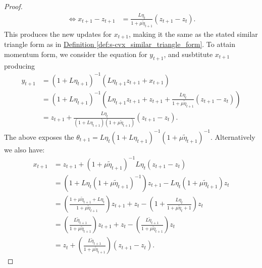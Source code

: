 \documentclass[12pt]{article}
\begin{document}
\begin{proof}
\begin{align*}
                \iff 
                x_{t + 1} - z_{t + 1} &= 
                \frac{L\eta_t}{1 + \mu \tilde \eta_{t + 1}} 
                (z_{t + 1} - z_t). 
            \end{align*}
            This produces the new updates for $x_{t +1}$, making it the same as the stated similar triangle form as in 
            \hyperref[def:s-cvx_similar_triangle_form]
                {Definition \ref*{def:s-cvx_similar_triangle_form}}. 
            To attain momentum form, we consider the equation for $y_{t + 1}$, and susbtitute $x_{t + 1}$ producing 
            \begin{align*}
                y_{t + 1} &= (1 + L\eta_{t + 1})^{-1}
                (
                    L\eta_{t + 1} z_{t + 1} + x_{t + 1}
                )
                \\
                &= 
                (1 + L\eta_{t + 1})^{-1}
                \left(
                    L\eta_{t + 1} z_{t + 1} + z_{t + 1}
                    + 
                    \frac{L\eta_t}{1 + \mu \tilde \eta_{t + 1}}
                    (z_{t + 1} - z_t)
                \right)
                \\
                &= z_{t + 1} 
                + 
                \frac{L\eta_t}{(1 + L\eta_{t + 1})(1 + \mu \tilde \eta_{t + 1})}
                (z_{t + 1} - z_t). 
            \end{align*}
            The above exposes the 
            $\theta_{t + 1} = L\eta_t(1 + L\eta_{t + 1})^{-1}(1 + \mu\tilde \eta_{t + 1})^{-1}$. 
            Alternatively we also have: 
            \begin{align*}
                x_{t + 1} &= z_{t + 1} + (1 + \mu\tilde \eta_{t + 1})^{-1}L\eta_t (z_{t + 1} - z_t)
                \\
                &=  (1 + L\eta_t(1 + \mu \tilde \eta_{t + 1})^{-1})z_{t + 1}
                - L\eta_t(1 + \mu\tilde \eta_{t + 1})z_t
                \\
                &= 
                \left(
                    \frac{1 + \mu\tilde \eta_{t + 1} + L \eta_t}{1 + \mu \tilde \eta_{t + 1}}
                \right)z_{t + 1}
                + 
                z_t - 
                \left(
                    1 + \frac{ L\eta_t}{1 + \mu \tilde \eta_t + 1}
                \right)z_t 
                \\
                &= 
                \left(
                    \frac{L\tilde \eta_{t+ 1}}{1 + \mu\tilde \eta_{t + 1}}
                \right)z_{t + 1}
                + 
                z_t 
                - 
                \left(
                    \frac{L\tilde \eta_{t + 1}}{1 + \mu \tilde \eta_{t + 1}}
                \right)z_t 
                \\
                &= z_t + 
                \left(
                    \frac{L\tilde \eta_{t + 1}}{1 + \mu \tilde \eta_{t + 1}}
                \right)
                (z_{t + 1} - z_t). 
            \end{align*}
        \end{proof}
\end{document}
